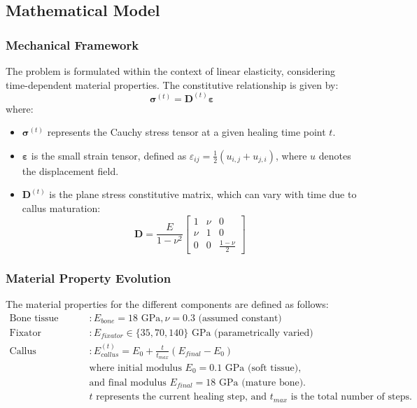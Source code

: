 \documentclass{article}
\begin{document}
\subsection{Mathematical Model}

\subsubsection{Mechanical Framework}

The problem is formulated within the context of linear elasticity, considering time-dependent material properties. The constitutive relationship is given by:
\[
  \bm{\sigma}^{(t)} = \mathbf{D}^{(t)}\bm{\varepsilon}
\]
where:
\begin{itemize}
  \item $\bm{\sigma}^{(t)}$ represents the Cauchy stress tensor at a given healing time point $t$.
  \item $\bm{\varepsilon}$ is the small strain tensor, defined as $\varepsilon_{ij} = \frac{1}{2}(u_{i,j} + u_{j,i})$, where $u$ denotes the displacement field.
  \item $\mathbf{D}^{(t)}$ is the plane stress constitutive matrix, which can vary with time due to callus maturation:
        \[
          \mathbf{D} = \frac{E}{1-\nu^2}\begin{bmatrix}
            1   & \nu & 0               \\
            \nu & 1   & 0               \\
            0   & 0   & \frac{1-\nu}{2}
          \end{bmatrix}
        \]
\end{itemize}

\subsubsection{Material Property Evolution}
The material properties for the different components are defined as follows:
\begin{align*}
  \text{Bone tissue (cortical)} & : E_{bone} = 18 \text{ GPa}, \nu = 0.3 \text{ (assumed constant)}                                 \\
  \text{Fixator}                & : E_{fixator} \in \{35, 70, 140\} \text{ GPa (parametrically varied)}                             \\
  \text{Callus}                 & : E_{callus}^{(t)} = E_0 + \frac{t}{t_{max}}(E_{final}-E_0)                                       \\
                                & \text{where initial modulus } E_0 = 0.1 \text{ GPa (soft tissue),}                                \\
                                & \text{and final modulus } E_{final} = 18 \text{ GPa (mature bone).}                               \\
                                & t \text{ represents the current healing step, and } t_{max} \text{ is the total number of steps.}
\end{align*}
\end{document}
